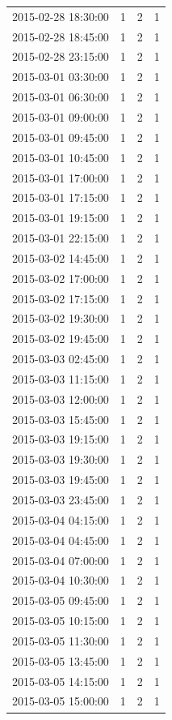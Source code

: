 \begin{tabular}{lrrr}
2015-02-28 18:30:00 & 1 & 2 & 1 \\
2015-02-28 18:45:00 & 1 & 2 & 1 \\
2015-02-28 23:15:00 & 1 & 2 & 1 \\
2015-03-01 03:30:00 & 1 & 2 & 1 \\
2015-03-01 06:30:00 & 1 & 2 & 1 \\
2015-03-01 09:00:00 & 1 & 2 & 1 \\
2015-03-01 09:45:00 & 1 & 2 & 1 \\
2015-03-01 10:45:00 & 1 & 2 & 1 \\
2015-03-01 17:00:00 & 1 & 2 & 1 \\
2015-03-01 17:15:00 & 1 & 2 & 1 \\
2015-03-01 19:15:00 & 1 & 2 & 1 \\
2015-03-01 22:15:00 & 1 & 2 & 1 \\
2015-03-02 14:45:00 & 1 & 2 & 1 \\
2015-03-02 17:00:00 & 1 & 2 & 1 \\
2015-03-02 17:15:00 & 1 & 2 & 1 \\
2015-03-02 19:30:00 & 1 & 2 & 1 \\
2015-03-02 19:45:00 & 1 & 2 & 1 \\
2015-03-03 02:45:00 & 1 & 2 & 1 \\
2015-03-03 11:15:00 & 1 & 2 & 1 \\
2015-03-03 12:00:00 & 1 & 2 & 1 \\
2015-03-03 15:45:00 & 1 & 2 & 1 \\
2015-03-03 19:15:00 & 1 & 2 & 1 \\
2015-03-03 19:30:00 & 1 & 2 & 1 \\
2015-03-03 19:45:00 & 1 & 2 & 1 \\
2015-03-03 23:45:00 & 1 & 2 & 1 \\
2015-03-04 04:15:00 & 1 & 2 & 1 \\
2015-03-04 04:45:00 & 1 & 2 & 1 \\
2015-03-04 07:00:00 & 1 & 2 & 1 \\
2015-03-04 10:30:00 & 1 & 2 & 1 \\
2015-03-05 09:45:00 & 1 & 2 & 1 \\
2015-03-05 10:15:00 & 1 & 2 & 1 \\
2015-03-05 11:30:00 & 1 & 2 & 1 \\
2015-03-05 13:45:00 & 1 & 2 & 1 \\
2015-03-05 14:15:00 & 1 & 2 & 1 \\
2015-03-05 15:00:00 & 1 & 2 & 1 \\

\end{tabular}
